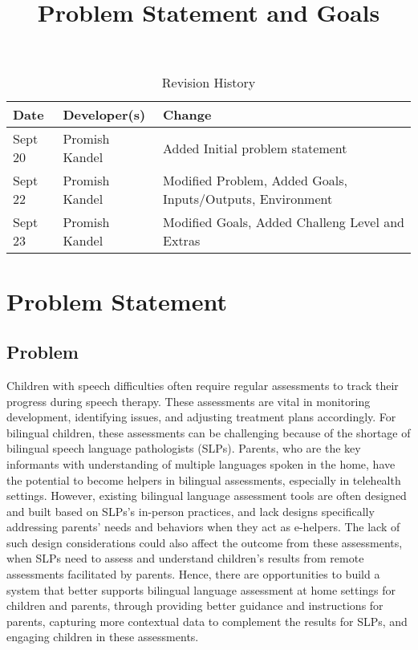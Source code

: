 \documentclass{article}
\title{Problem Statement and Goals\\\progname}
\author{\authname}
\date{}
\begin{document}
\maketitle

\begin{table}[hp]
\caption{Revision History} \label{TblRevisionHistory}
\begin{tabularx}{\textwidth}{llX}
\toprule
\textbf{Date} & \textbf{Developer(s)} & \textbf{Change}\\
\midrule
Sept 20 & Promish Kandel& Added Initial problem statement\\
Sept 22 & Promish Kandel & Modified Problem, Added Goals, Inputs/Outputs, Environment\\
Sept 23 & Promish Kandel & Modified Goals, Added Challeng Level and Extras\\
\bottomrule
\end{tabularx}
\end{table}

\section{Problem Statement}


\subsection{Problem}
\hspace{2em}Children with speech difficulties often require regular assessments to track their progress during speech therapy. These assessments are vital in monitoring development, identifying issues, and adjusting treatment plans accordingly. For bilingual children, these assessments can be challenging because of the shortage of bilingual  speech language pathologists (SLPs).  Parents, who are the key informants with understanding of multiple languages spoken in the home, have the potential to become helpers in bilingual assessments, especially in telehealth settings. However, existing bilingual language assessment tools are often designed and built based on SLPs’s in-person practices, and lack designs specifically addressing parents’ needs and behaviors when they act as e-helpers. The lack of such design considerations could also affect the outcome from these assessments, when SLPs need to assess and understand children’s results from remote assessments facilitated by parents. Hence, there are opportunities to build a system that better supports bilingual language assessment at home settings for children and parents, through providing better guidance and instructions for parents, capturing more contextual data to complement the results for SLPs, and engaging children in these assessments. 
\end{document}
